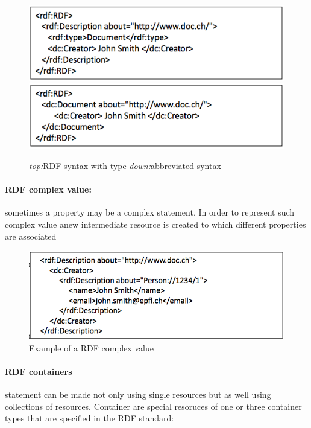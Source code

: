 \begin{figure}[H]
\begin{center}
\includegraphics[width=1\linewidth]{figures/type.png}
\includegraphics[width= 1\linewidth]{figures/abbr.png}
\end{center}
\caption{\textit{top:}RDF syntax with type \textit{down:}abbreviated syntax}
\end{figure}

\paragraph{RDF complex value:} sometimes a property may be a complex statement. In order to represent such complex value anew intermediate resource is created to which different properties are associated

\begin{figure}[H]
\begin{center}
\includegraphics[width=1\linewidth]{figures/complexRDF.png}
\end{center}
\caption{Example of a RDF complex value}
\end{figure}

\paragraph{RDF containers}statement can be made not only using single resources but  as well using collections of resources. Container are special resoruces of one or three container types that are specified in the RDF standard:


